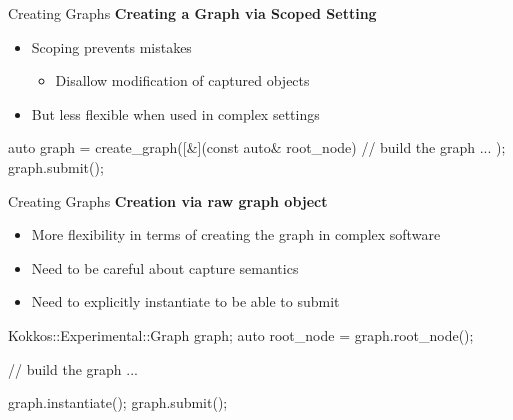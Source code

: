 
\begin{frame}[fragile]{Creating Graphs}
\textbf{Creating a Graph via Scoped Setting}

\begin{itemize}
  \item{Scoping prevents mistakes}
	  \begin{itemize}
		  \item{Disallow modification of captured objects}
	  \end{itemize}
  \item{But less flexible when used in complex settings}
\end{itemize}

\pause
\begin{code}[linebackgroundcolor={},keywords={create_graph}]
auto graph = create_graph([&](const auto& root_node) {
  // build the graph
  ...
});
graph.submit();
\end{code}
\end{frame}
\begin{frame}[fragile]{Creating Graphs}
  \textbf{Creation via raw graph object}
\begin{itemize}
		  \item{More flexibility in terms of creating the graph in complex software}
		  \item{Need to be careful about capture semantics}
                  \item{Need to explicitly instantiate to be able to submit}
\end{itemize}

\begin{code}[linebackgroundcolor={},keywords={Graph}]
Kokkos::Experimental::Graph graph;
auto root_node = graph.root_node();

// build the graph
...

graph.instantiate();
graph.submit();
\end{code}


\end{frame}


